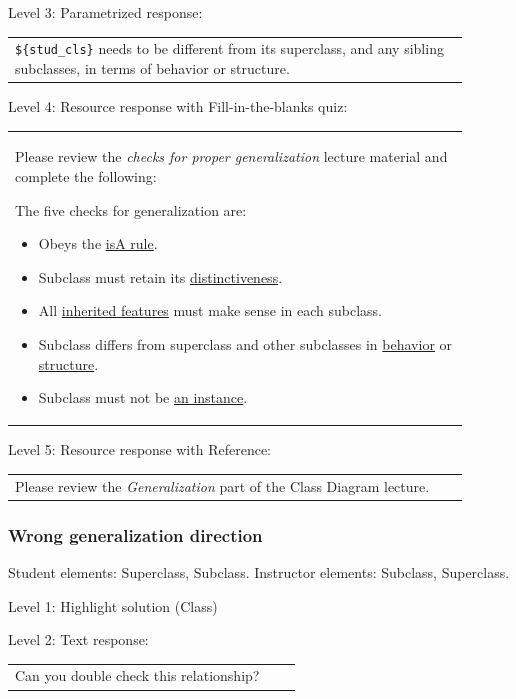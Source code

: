 \noindent Level 3: Parametrized response: \medskip

\begin{tabular}{|p{0.9\linewidth}}
\verb|${stud_cls}| needs to be different from its superclass, and any sibling subclasses, in terms of behavior or structure.
\end{tabular} \medskip

\noindent Level 4: Resource response with Fill-in-the-blanks quiz: \medskip

\begin{tabular}{|p{0.9\linewidth}}

Please review the \textit{checks for proper generalization} lecture material
and complete the following:

The five checks for generalization are:

\begin{itemize}
    \item Obeys the \underline{isA rule}.
    \item Subclass must retain its \underline{distinctiveness}.
    \item All \underline{inherited features} must make sense in each subclass.
    \item Subclass differs from superclass and other subclasses in \underline{behavior} or \underline{structure}.
    \item Subclass must not be \underline{an instance}.
\end{itemize}

\end{tabular} \medskip

\noindent Level 5: Resource response with Reference: \medskip

\begin{tabular}{|p{0.9\linewidth}}
Please review the \textit{Generalization} part of the Class Diagram lecture.
\end{tabular} \medskip


\subsubsection{Wrong generalization direction}

Student elements: Superclass, Subclass. Instructor elements: Subclass, Superclass. \medskip

\noindent Level 1: Highlight solution (Class) \medskip

\noindent Level 2: Text response: \medskip

\begin{tabular}{|p{0.9\linewidth}}
Can you double check this relationship?
\end{tabular} \medskip

